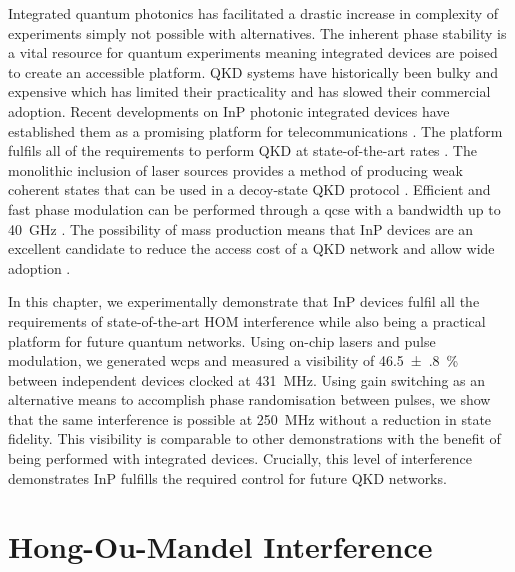 Integrated quantum photonics has facilitated a drastic increase in complexity of experiments simply not possible with alternatives. The inherent phase stability is a vital resource for quantum experiments meaning integrated devices are poised to create an accessible platform. \Ac{QKD} systems have historically been bulky and expensive which has limited their practicality and has slowed their commercial adoption. Recent developments on \ac{InP} photonic integrated devices have established them as a promising platform for telecommunications \cite{smit2014}. The platform fulfils all of the requirements to perform \ac{QKD} at state-of-the-art rates \cite{Sibson2017InP}. The monolithic inclusion of laser sources provides a method of producing weak coherent states that can be used in a decoy-state QKD protocol \cite{Lo2005}. Efficient and fast phase modulation can be performed through a \ac{qcse} with a bandwidth up to \SI{40}{GHz} \cite{smit2014}. The possibility of mass production means that \ac{InP} devices are an excellent candidate to reduce the access cost of a \ac{QKD} network and allow wide adoption \cite{JeppixRoadmap}.

In this chapter, we experimentally demonstrate that \ac{InP} devices fulfil all the requirements of state-of-the-art \ac{HOM} interference while also being a practical platform for future quantum networks. Using on-chip lasers and pulse modulation, we generated \acp{wcp} and measured a visibility of \SI{46.5(8)}{\percent} between independent devices clocked at \SI{431}{MHz}. Using gain switching as an alternative means to accomplish phase randomisation between pulses, we show that the same interference is possible at \SI{250}{MHz} without a reduction in state fidelity. This visibility is comparable to other demonstrations \cite{Yuan2014, Rubenok2013, Comandar2016} with the benefit of being performed with integrated devices. Crucially, this level of interference demonstrates \ac{InP} fulfills the required control for future \ac{QKD} networks.


\section{Hong-Ou-Mandel Interference}

